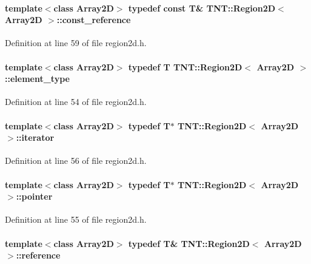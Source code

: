 \paragraph[{const\_\-reference}]{\setlength{\rightskip}{0pt plus 5cm}template$<$class Array2D$>$ typedef const {\bf T}\& {\bf TNT::Region2D}$<$ Array2D $>$::{\bf const\_\-reference}}\hfill\label{class_t_n_t_1_1_region2_d_a89762bf682b0d388b72b821a3a48e6bc}


Definition at line 59 of file region2d.h.

\paragraph[{element\_\-type}]{\setlength{\rightskip}{0pt plus 5cm}template$<$class Array2D$>$ typedef {\bf T} {\bf TNT::Region2D}$<$ Array2D $>$::{\bf element\_\-type}}\hfill\label{class_t_n_t_1_1_region2_d_a21bf96002e218ab5715737f052528658}


Definition at line 54 of file region2d.h.

\paragraph[{iterator}]{\setlength{\rightskip}{0pt plus 5cm}template$<$class Array2D$>$ typedef {\bf T}$\ast$ {\bf TNT::Region2D}$<$ Array2D $>$::{\bf iterator}}\hfill\label{class_t_n_t_1_1_region2_d_ab6fffab6d7607222f1bc7f840cb6e181}


Definition at line 56 of file region2d.h.

\paragraph[{pointer}]{\setlength{\rightskip}{0pt plus 5cm}template$<$class Array2D$>$ typedef {\bf T}$\ast$ {\bf TNT::Region2D}$<$ Array2D $>$::{\bf pointer}}\hfill\label{class_t_n_t_1_1_region2_d_ab0a7a27e7e90e47ba12d57ae37d59d90}


Definition at line 55 of file region2d.h.

\paragraph[{reference}]{\setlength{\rightskip}{0pt plus 5cm}template$<$class Array2D$>$ typedef {\bf T}\& {\bf TNT::Region2D}$<$ Array2D $>$::{\bf reference}}\hfill\label{class_t_n_t_1_1_region2_d_a9aac9872c214c5647a927ea20bd940bc}



